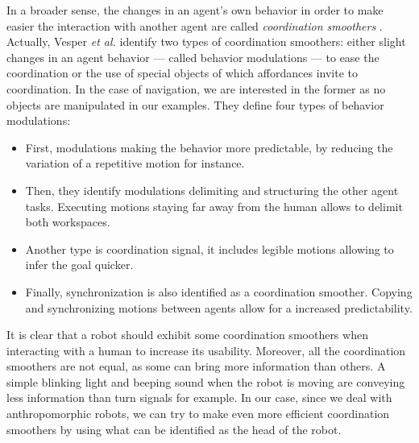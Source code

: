 \documentclass[a4paper,11pt,twoside]{StyleThese}
\begin{document}
In a broader sense, the changes in an agent's own behavior in order to make easier the interaction with another agent are called \textit{coordination smoothers} \cite{vesper_minimal_2010}. Actually, Vesper \textit{et al.} identify two types of coordination smoothers: either slight changes in an agent behavior --- called behavior modulations --- to ease the coordination or the use of special objects of which affordances invite to coordination. In the case of navigation, we are interested in the former as no objects are manipulated in our examples. They define four types of behavior modulations:
\begin{itemize}
\item First, modulations making the behavior more predictable, by reducing the variation of a repetitive motion for instance. 

\item Then, they identify modulations delimiting and structuring the other agent tasks. Executing motions staying far away from the human allows to delimit both workspaces. 

\item Another type is coordination signal, it includes legible motions allowing to infer the goal quicker. 

\item Finally, synchronization is also identified as a coordination smoother. Copying and synchronizing motions between agents allow for a increased predictability.
\end{itemize} 

It is clear that a robot should exhibit some coordination smoothers when interacting with a human to increase its usability. Moreover, all the coordination smoothers are not equal, as some can bring more information than others. A simple blinking light and beeping sound when the robot is moving are conveying less information than turn signals for example. In our case, since we deal with anthropomorphic robots, we can try to make even more efficient coordination smoothers by using what can be identified as the head of the robot.
\end{document}
